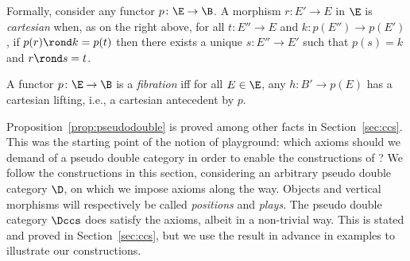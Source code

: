 \documentclass{LMCS}
\theoremstyle{plain}\newtheorem{satz}[thm]{Satz}
\begin{document}
Formally, consider any functor $p \colon \E \to \B$. A morphism $r
\colon E' \to E$ in $\E$ is \emph{cartesian} when, as on the right
above, for all $t \colon E'' \to E$ and $k \colon p(E'') \to p(E')$,
if $p(r) \rond k = p(t)$ then there exists a unique $s \colon E'' \to
E'$ such that $p(s) = k$ and $r \rond s = t$.
\begin{defi} 
  A functor $p \colon \E \to \B$ is a \emph{fibration} iff for all $E 
  \in \E$, any $h \colon B' \to p(E)$ has a cartesian lifting, i.e., a 
  cartesian antecedent by $p$. 
\end{defi} 

Proposition~\ref{prop:pseudodouble} is proved among other facts in
Section~\ref{sec:ccs}.  This was the starting point of the
notion of playground: which axioms should we demand of a pseudo double
category in order to enable the constructions of
?  We follow the constructions in this
section, considering an arbitrary pseudo double category $\D$, on
which we impose axioms along the way. Objects and vertical
morphisms will respectively be called \emph{positions} and
\emph{plays}. The pseudo double category $\Dccs$ does satisfy the
axioms, albeit in a non-trivial way. This is stated and proved in
Section~\ref{sec:ccs}, but we use the result in advance in examples to
illustrate our constructions. 
\end{document}
